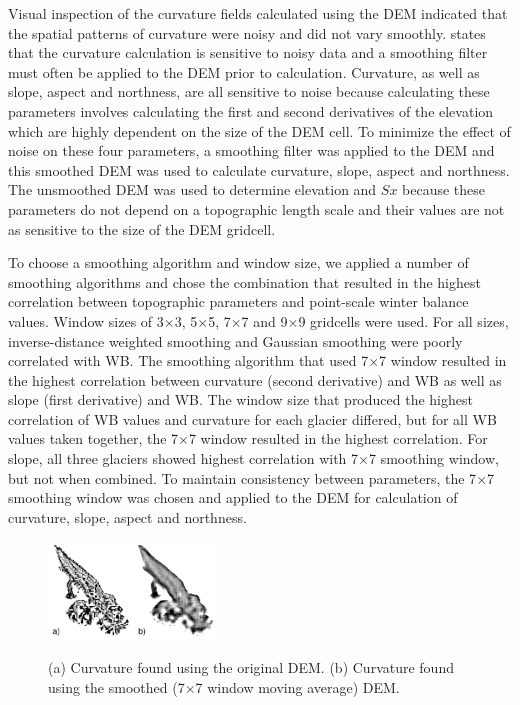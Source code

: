 \documentclass[onecolumn, letterpaper]{igs}
\begin{document}
Visual inspection of the curvature fields calculated using the DEM indicated that the spatial patterns of curvature were noisy and did not vary smoothly. \cite{Olaya2009} states that the curvature calculation is sensitive to noisy data and a smoothing filter must often be applied to the DEM prior to calculation. Curvature, as well as slope, aspect and northness, are all sensitive to noise because calculating these parameters involves calculating the first and second derivatives of the elevation which are highly dependent on the size of the DEM cell. To minimize the effect of noise on these four parameters, a smoothing filter was applied to the DEM and this smoothed DEM was used to calculate curvature, slope, aspect and northness. The unsmoothed DEM was used to determine elevation and $Sx$ because these parameters do not depend on a topographic length scale and their values are not as sensitive to the size of the DEM gridcell.

To choose a smoothing algorithm and window size, we applied a number of smoothing algorithms and chose the combination that resulted in the highest correlation between topographic parameters and point-scale winter balance values. Window sizes of 3$\times$3, 5$\times$5, 7$\times$7 and 9$\times$9 gridcells were used. For all sizes, inverse-distance weighted smoothing and Gaussian smoothing were poorly correlated with WB. The smoothing algorithm that used 7$\times$7 window resulted in the highest correlation between curvature (second derivative) and WB as well as slope (first derivative) and WB. The window size that produced the highest correlation of WB values and curvature for each glacier differed, but for all WB values taken together, the 7$\times$7 window resulted in the highest correlation. For slope, all three glaciers showed highest correlation with 7$\times$7 smoothing window, but not when combined. To maintain consistency between parameters, the 7$\times$7 smoothing window was chosen and applied to the DEM for calculation of curvature, slope, aspect and northness. 

\begin{figure}[H]
	\centering
	\includegraphics[width = 0.4\textwidth]{G13curvatureSmoothing.jpeg}\\
	\caption[Curvature found using the original and smoothed DEM]{(a) Curvature found using the original DEM. (b) Curvature found using the smoothed (7$\times$7 window moving average) DEM.}
	\label{fig:smoothingCurve}
\end{figure}
\end{document}
